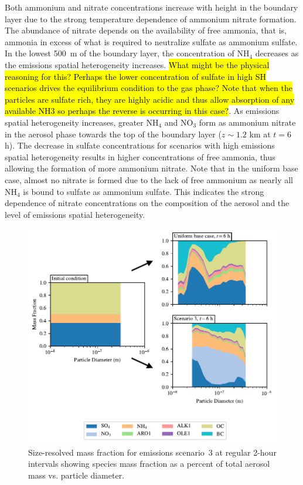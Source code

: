 \documentclass[journal abbreviation, manuscript]{copernicus}
\begin{document}
Both ammonium and nitrate concentrations increase with height in the boundary layer due to the strong temperature dependence of ammonium nitrate formation. The abundance of nitrate depends on the availability of free ammonia, that is, ammonia in excess of what is required to neutralize sulfate as ammonium sulfate. In the lowest 500~m of the boundary layer, the concentration of NH$_4$ decreases as the emissions spatial heterogeneity increases. \hl{What might be the physical reasoning for this? Perhaps the lower concentration of sulfate in high SH scenarios drives the equilibrium condition to the gas phase? Note that when the particles are sulfate rich, they are highly acidic and thus allow absorption of any available NH3 so perhaps the reverse is occurring in this case?}. As emissions spatial heterogeneity increases, greater 
NH$_4$ and NO$_3$ form as ammonium nitrate in the aerosol phase towards the top of the boundary layer ($z\sim1.2$ km at $t=6$ h). The decrease in sulfate concentrations for scenarios with high emissions spatial heterogeneity results in higher concentrations of free ammonia, thus allowing the formation of more ammonium nitrate. Note that in the uniform base case, almost no nitrate is formed due to the lack of free ammonium as nearly all NH$_4$ is bound to sulfate as ammonium sulfate. This indicates the strong dependence of nitrate concentrations on the composition of the aerosol and the level of emissions spatial heterogeneity. 

\begin{figure}[!h]
	\centering
	\includegraphics[]{figures/speciated-mass-frac-three-panel-z40.pdf}
	\caption{Size-resolved mass fraction for emissions scenario~3 at regular 2-hour intervals showing species mass fraction as a percent of total aerosol mass vs. particle diameter.}
	\label{fig:speciated-mass-frac}
\end{figure} 
\end{document}
